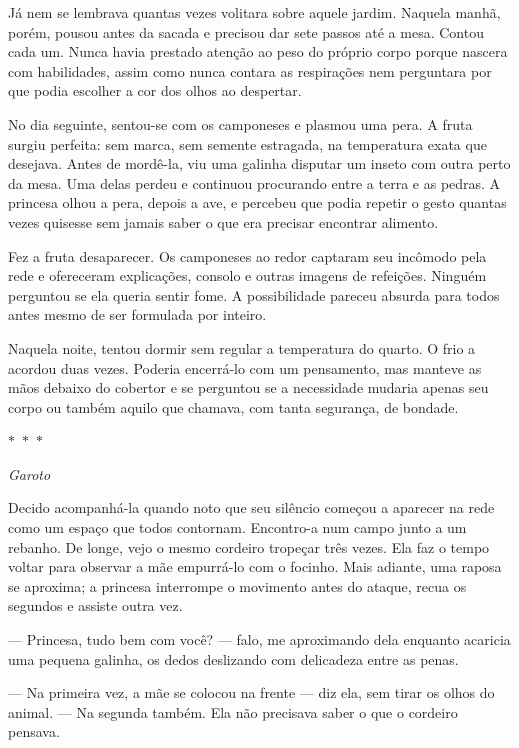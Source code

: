 Já nem se lembrava quantas vezes volitara sobre aquele jardim. Naquela manhã, porém, pousou antes da sacada e precisou dar sete passos até a mesa. Contou cada um. Nunca havia prestado atenção ao peso do próprio corpo porque nascera com habilidades, assim como nunca contara as respirações nem perguntara por que podia escolher a cor dos olhos ao despertar.

No dia seguinte, sentou-se com os camponeses e plasmou uma pera. A fruta surgiu perfeita: sem marca, sem semente estragada, na temperatura exata que desejava. Antes de mordê-la, viu uma galinha disputar um inseto com outra perto da mesa. Uma delas perdeu e continuou procurando entre a terra e as pedras. A princesa olhou a pera, depois a ave, e percebeu que podia repetir o gesto quantas vezes quisesse sem jamais saber o que era precisar encontrar alimento.

Fez a fruta desaparecer. Os camponeses ao redor captaram seu incômodo pela rede e ofereceram explicações, consolo e outras imagens de refeições. Ninguém perguntou se ela queria sentir fome. A possibilidade pareceu absurda para todos antes mesmo de ser formulada por inteiro.

Naquela noite, tentou dormir sem regular a temperatura do quarto. O frio a acordou duas vezes. Poderia encerrá-lo com um pensamento, mas manteve as mãos debaixo do cobertor e se perguntou se a necessidade mudaria apenas seu corpo ou também aquilo que chamava, com tanta segurança, de bondade.

\begin{center}
$\ast$~$\ast$~$\ast$

\textit{Garoto}
\end{center}

Decido acompanhá-la quando noto que seu silêncio começou a aparecer na rede como um espaço que todos contornam. Encontro-a num campo junto a um rebanho. De longe, vejo o mesmo cordeiro tropeçar três vezes. Ela faz o tempo voltar para observar a mãe empurrá-lo com o focinho. Mais adiante, uma raposa se aproxima; a princesa interrompe o movimento antes do ataque, recua os segundos e assiste outra vez.

— Princesa, tudo bem com você? — falo, me aproximando dela enquanto acaricia uma pequena galinha, os dedos deslizando com delicadeza entre as penas.

— Na primeira vez, a mãe se colocou na frente — diz ela, sem tirar os olhos do animal. — Na segunda também. Ela não precisava saber o que o cordeiro pensava.

